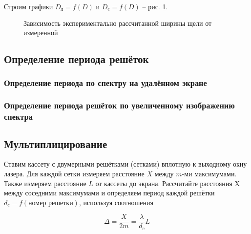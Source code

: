 \documentclass[a5paper,10pt, twoside]{article} %
\begin{document}
	Строим графики $D_{\text{л}} = f(D)$ и $D_c = f(D)$ -- рис. \ref{gr:1}.

	\begin{figure}[h!]\label{gr:1}
		\caption{Зависимость экспериментально рассчитанной ширины щели от измеренной }
	\end{figure}

\subsection{Определение периода решёток}

	\subsubsection{Определение периода по спектру на удалённом экране}

	\subsubsection{Определение периода решёток по увеличенному изображению спектра}

\subsection{Мультиплицирование}

	Ставим кассету с двумерными решётками (сетками) вплотную к выходному окну лазера. Для каждой 
	сетки измеряем расстояние $X$ между $m$-ми максимумами. Также измеряем расстояние $L$ от кассеты 
	до экрана. Рассчитайте расстояния X между соседними максимумами и определяем период каждой решётки 
	$d_c = f(\text{номер решетки})$, используя соотношения

	\begin{equation}
		\Delta= \frac{X}{2m} = \frac{\lambda}{d_c} L
	\end{equation}
\end{document}
